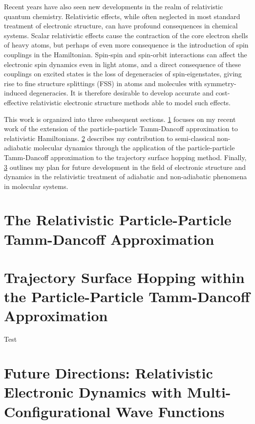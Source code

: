 \documentclass[12pt]{article}
\begin{document}
Recent years have also seen new developments in the realm of relativistic
quantum chemistry.  Relativistic effects, while often neglected in most standard
treatment of electronic structure, can have profound consequences in chemical
systems.\cite{Pyykko12_45} Scalar relativistic effects cause the contraction of
the core electron shells of heavy atoms, but perhaps of even more consequence is
the introduction of spin couplings in the Hamiltonian.  Spin-spin and spin-orbit
interactions can affect the electronic spin dynamics even in light atoms, and a
direct consequence of these couplings on excited states is the loss of
degeneracies of spin-eigenstates, giving rise to fine structure splittings (FSS)
in atoms and molecules with symmetry-induced degeneracies. It is therefore
desirable to develop accurate and cost-effective relativistic electronic
structure methods able to model such effects.

This work is organized into three subsequent sections.
\cref{sec:pp-X2C} focuses on my recent work of the extension of the
particle-particle Tamm-Dancoff approximation to relativistic Hamiltonians.
\cref{sec:pp-TSH} describes my contribution to semi-classical non-adiabatic
molecular dynamics through the application of the particle-particle Tamm-Dancoff
approximation to the trajectory surface hopping method.  Finally,
\cref{sec:Future} outlines my plan for future development in the field of
electronic structure and dynamics in the relativistic treatment of adiabatic and
non-adiabatic phenomena in molecular systems.


\section{The Relativistic Particle-Particle Tamm-Dancoff Approximation}
\label{sec:pp-X2C}


\section{Trajectory Surface Hopping within the Particle-Particle Tamm-Dancoff Approximation}
\label{sec:pp-TSH}
Test\cite{DBWY16_JCTC935,DBWY16_Accepted1,DBWY16_Submitted1,DBWY16_Submitted2}

\section{Future Directions: Relativistic Electronic Dynamics with Multi-Configurational Wave Functions}
\label{sec:Future}


\end{document}
